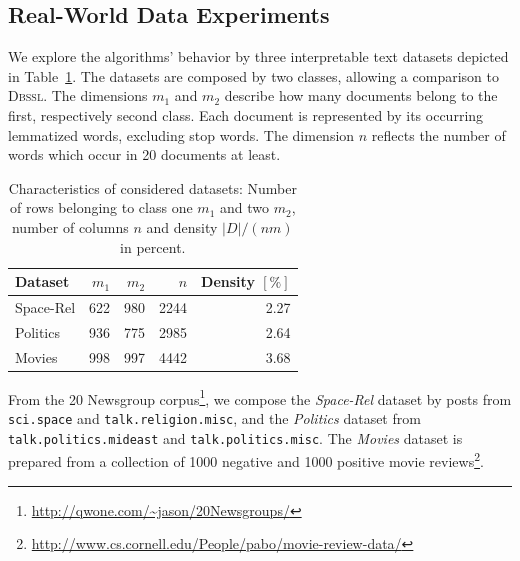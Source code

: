 \subsection{Real-World Data Experiments}
We explore the algorithms' behavior by three interpretable text datasets depicted in Table~\ref{tbl:CS:datasets}. The datasets are composed by two classes, allowing a comparison to \textsc{Dbssl}. The dimensions $m_1$ and $m_2$ describe how many documents belong to the first, respectively second class. Each document is represented by its occurring lemmatized words, excluding stop words. The dimension $n$ reflects the number of words which occur in 20 documents at least.
\begin{table}[!t]
 	\centering
 	\begin{tabular}{l@{\hskip 0.1in}r@{\hskip 0.1in}r@{\hskip 0.1in}r@{\hskip 0.1in}r}\toprule
     Dataset & $m_1$ & $m_2$ & $n$ & Density $[\%]$\\
     \midrule
     Space-Rel & 622 & 980 & 2244 & 2.27\\
     Politics & 936 & 775 & 2985 & 2.64\\
     Movies & 998 & 997 & 4442 & 3.68\\ \bottomrule
     \end{tabular}
     \caption{Characteristics of considered datasets: Number of rows belonging to class one $m_1$ and two $m_2$, number of columns $n$ and density $\lvert D\rvert /(nm)$ in percent.}
   \label{tbl:CS:datasets}
\end{table}
From the 20 Newsgroup corpus\footnote{\url{http://qwone.com/~jason/20Newsgroups/}}, we compose the \emph{Space-Rel} dataset by posts from \texttt{sci.space} and \texttt{talk.religion.misc}, and the \emph{Politics} dataset from \texttt{talk.politics.mideast} and \texttt{talk.politics.misc}. The \emph{Movies} dataset is prepared from a collection of 1000 negative and 1000 positive movie reviews\footnote{\url{http://www.cs.cornell.edu/People/pabo/movie-review-data/}}.

